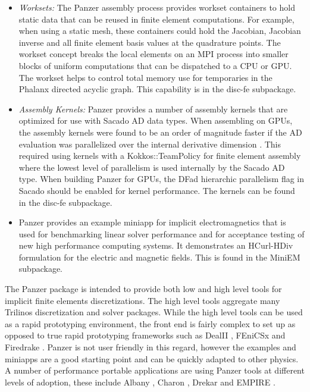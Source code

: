 \begin{itemize}
\item \emph{Worksets:} The Panzer assembly process provides workset containers to hold static data that can be reused in finite element computations. For example, when using a static mesh, these containers could hold the Jacobian, Jacobian inverse and all finite element basis values at the quadrature points. The workset concept breaks the local elements on an MPI process into smaller blocks of uniform computations that can be dispatched to a CPU or GPU. The workset helps to control total memory use for temporaries in the Phalanx directed acyclic graph. This capability is in the disc-fe subpackage.
\item \emph{Assembly Kernels:} Panzer provides a number of assembly kernels that are optimized for use with Sacado AD data types. When assembling on GPUs, the assembly kernels were found to be an order of magnitude faster if the AD evaluation was parallelized over the internal derivative dimension \cite{phipps2022automatic}. This required using kernels with a Kokkos::TeamPolicy for finite element assembly where the lowest level of parallelism is used internally by the Sacado AD type. When building Panzer for GPUs, the DFad hierarchic parallelism flag in Sacado should be enabled for kernel performance. The kernels can be found in the disc-fe subpackage. 
\item Panzer provides an example miniapp for implicit electromagnetics that is used for benchmarking linear solver performance and for acceptance testing of new high performance computing systems. It demonstrates an HCurl-HDiv formulation for the electric and magnetic fields. This is found in the MiniEM subpackage.
\end{itemize}

The Panzer package is intended to provide both low and high level tools for implicit finite elements discretizations. The high level tools aggregate many Trilinos discretization and solver packages. While the high level tools can be used as a rapid prototyping environment, the front end is fairly complex to set up as opposed to true rapid prototyping frameworks such as DealII \cite{dealII95}, FEniCSx \cite{BarattaEtal2023} and Firedrake \cite{FiredrakeUserManual}. Panzer is not user friendly in this regard, however the examples and miniapps are a good starting point and can be quickly adapted to other physics. A number of performance portable applications are using Panzer tools at different levels of adoption, these include Albany \cite{Salinger2016}, Charon \cite{CharonUsersManual2020}, Drekar \cite{Crockatt2022,Miller2019,Shadid2016mhd} and EMPIRE \cite{BettencourtBrownEtAl2021_EmpirePic}.

